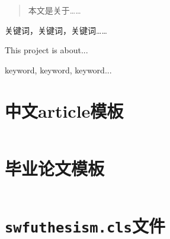 \documentclass{swfuthesism}
\begin{document}
\maketitle

\begin{abstract} %
  本文是关于……
\end{abstract}

\begin{keyword} %
  关键词，关键词，关键词……
\end{keyword}

\begin{eabstract} %
  This project is about...
\end{eabstract}

\begin{ekeyword} %
  keyword, keyword, keyword...
\end{ekeyword}

\frontmatter
\tableofcontents %

\cleardoublepage %

\mainmatter






\appendix %

\makebib  %

\singlespacing





\chapter{中文article模板}
\label{app:article}

\inputminted{latex}{article.tex}

\chapter{毕业论文模板}
\label{app:thesis}

\inputminted{latex}{thesis-template.tex}

\chapter{\texttt{swfuthesism.cls}文件}
\label{app:class}
\end{document}
